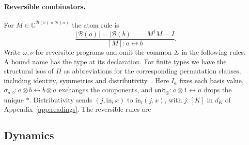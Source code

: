 \documentclass[acmsmall,screen,review,anonymous,nonacm]{acmart}
\newcommand{\C}{\mathbb C}
\newcommand{\isorule}[2]{\inferrule{#1}{#2}}
\numberwithin{equation}{section}
\begin{document}
\paragraph{Reversible combinators.}
For $M\in\C^{\mathcal B(b)\times\mathcal B(a)}$ the atom rule is
\[
 \frac{|\mathcal B(a)|=|\mathcal B(b)|\qquad M^\dagger M=I}
      {[M]:a\leftrightarrow b}.
\]
Write $\omega,\nu$ for reversible programs and omit the common $\Sigma$ in
the following rules. A bound name has the
type at its declaration. For finite types we have the structural isos
of $\Pi$ as abbreviations for the corresponding permutation clauses,
including identity, symmetries and distributivity~\cite[\S~2]{JamesSabry13Interpreters}. Here $I_a$ fixes each basis value, $\sigma_{a,b}:a\otimes b\leftrightarrow b\otimes a$
exchanges the components, and $\mathsf{unit}_\otimes:a\otimes1\leftrightarrow a$
drops the unique $*$. Distributivity sends $(j,\mathrm{in}_i\,x)$ to
$\mathrm{in}_i(j,x)$, with $j:[K]$ in $d_K$ of Appendix~\ref{app:readings}.
The reversible rules are

\subsection{Dynamics}
\end{document}
